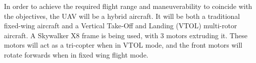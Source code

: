 In order to achieve the required flight range and maneuverability to coincide with the objectives, the UAV will be a hybrid aircraft. It will be both a traditional fixed-wing aircraft and a Vertical Take‐Off and Landing (VTOL) multi-rotor aircraft.  A Skywalker X8 frame is being used, with 3 motors extruding it. These motors will act as a tri-copter when in VTOL mode, and the front motors will rotate forwards when in fixed wing flight mode.  

